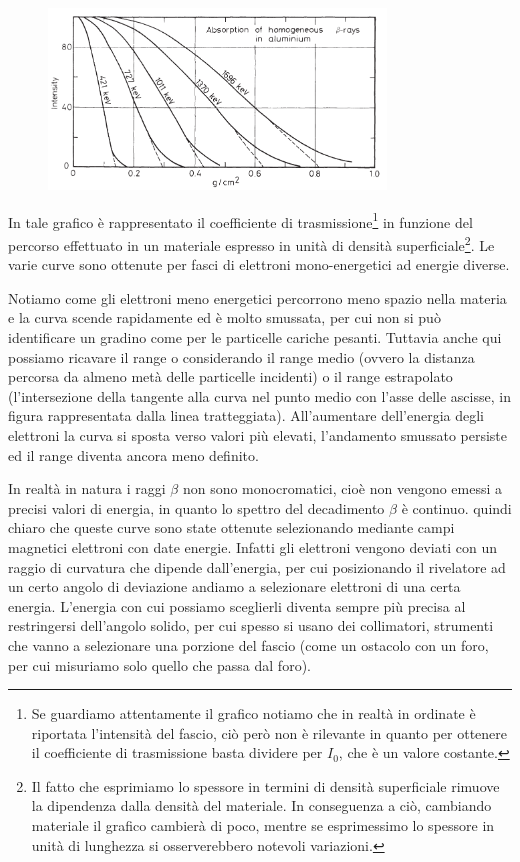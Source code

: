 \begin{figure}[H]
    \centering
    \includegraphics[width=0.8\textwidth]{immagini/range_elettroni.png}
\end{figure}

In tale grafico è rappresentato il coefficiente di trasmissione\footnote{Se guardiamo attentamente il grafico notiamo che in realtà in ordinate è riportata l'intensità del fascio, ciò però non è rilevante in quanto per ottenere il coefficiente di trasmissione basta dividere per $I_0$, che è un valore costante.} in funzione del percorso effettuato in un materiale espresso in unità di densità superficiale\footnote{Il fatto che esprimiamo lo spessore in termini di densità superficiale rimuove la dipendenza dalla densità del materiale. In conseguenza a ciò, cambiando materiale il grafico cambierà di poco, mentre se esprimessimo lo spessore in unità di lunghezza si osserverebbero notevoli variazioni.}. Le varie curve sono ottenute per fasci di elettroni mono-energetici ad energie diverse.

Notiamo come gli elettroni meno energetici percorrono meno spazio nella materia e la curva scende rapidamente ed è molto smussata, per cui non si può identificare un gradino come per le particelle cariche pesanti. Tuttavia anche qui possiamo ricavare il range o considerando il range medio (ovvero la distanza percorsa da almeno metà delle particelle incidenti) o il range estrapolato (l'intersezione della tangente alla curva nel punto medio con l'asse delle ascisse, in figura rappresentata dalla linea tratteggiata). All'aumentare dell'energia degli elettroni la curva si sposta verso valori più elevati, l'andamento smussato persiste ed il range diventa ancora meno definito.

In realtà in natura i raggi $\beta$ non sono monocromatici, cioè non vengono emessi a precisi valori di energia, in quanto lo spettro del decadimento $\beta$ è continuo. \E quindi chiaro che queste curve sono state ottenute selezionando mediante campi magnetici elettroni con date energie. Infatti gli elettroni vengono deviati con un raggio di curvatura che dipende dall'energia, per cui posizionando il rivelatore ad un certo angolo di deviazione andiamo a selezionare elettroni di una certa energia. L'energia con cui possiamo sceglierli diventa sempre più precisa al restringersi dell'angolo solido, per cui spesso si usano dei collimatori, strumenti che vanno a selezionare una porzione del fascio (come un ostacolo con un foro, per cui misuriamo solo quello che passa dal foro).

